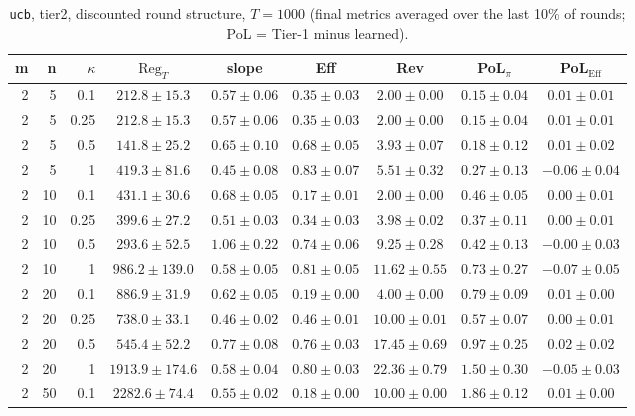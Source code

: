 \begin{table}[htbp]
\centering
\scriptsize
\caption{\texttt{ucb}, tier2, discounted round structure, $T=1000$ (final metrics averaged over the last 10\% of rounds; PoL = Tier-1 minus learned).}
\label{tab:tier2_ucb_discounted}
\begin{tabular}{@{}rrrcccccc@{}}
\toprule
m & n & $\kappa$ & $\mathrm{Reg}_T$ & slope & Eff & Rev & PoL$_\pi$ & PoL$_\mathrm{Eff}$ \\
\midrule
2 & 5 & 0.1 & $212.8 \pm 15.3$ & $0.57 \pm 0.06$ & $0.35 \pm 0.03$ & $2.00 \pm 0.00$ & $0.15 \pm 0.04$ & $0.01 \pm 0.01$ \\
2 & 5 & 0.25 & $212.8 \pm 15.3$ & $0.57 \pm 0.06$ & $0.35 \pm 0.03$ & $2.00 \pm 0.00$ & $0.15 \pm 0.04$ & $0.01 \pm 0.01$ \\
2 & 5 & 0.5 & $141.8 \pm 25.2$ & $0.65 \pm 0.10$ & $0.68 \pm 0.05$ & $3.93 \pm 0.07$ & $0.18 \pm 0.12$ & $0.01 \pm 0.02$ \\
2 & 5 & 1 & $419.3 \pm 81.6$ & $0.45 \pm 0.08$ & $0.83 \pm 0.07$ & $5.51 \pm 0.32$ & $0.27 \pm 0.13$ & $-0.06 \pm 0.04$ \\
2 & 10 & 0.1 & $431.1 \pm 30.6$ & $0.68 \pm 0.05$ & $0.17 \pm 0.01$ & $2.00 \pm 0.00$ & $0.46 \pm 0.05$ & $0.00 \pm 0.01$ \\
2 & 10 & 0.25 & $399.6 \pm 27.2$ & $0.51 \pm 0.03$ & $0.34 \pm 0.03$ & $3.98 \pm 0.02$ & $0.37 \pm 0.11$ & $0.00 \pm 0.01$ \\
2 & 10 & 0.5 & $293.6 \pm 52.5$ & $1.06 \pm 0.22$ & $0.74 \pm 0.06$ & $9.25 \pm 0.28$ & $0.42 \pm 0.13$ & $-0.00 \pm 0.03$ \\
2 & 10 & 1 & $986.2 \pm 139.0$ & $0.58 \pm 0.05$ & $0.81 \pm 0.05$ & $11.62 \pm 0.55$ & $0.73 \pm 0.27$ & $-0.07 \pm 0.05$ \\
2 & 20 & 0.1 & $886.9 \pm 31.9$ & $0.62 \pm 0.05$ & $0.19 \pm 0.00$ & $4.00 \pm 0.00$ & $0.79 \pm 0.09$ & $0.01 \pm 0.00$ \\
2 & 20 & 0.25 & $738.0 \pm 33.1$ & $0.46 \pm 0.02$ & $0.46 \pm 0.01$ & $10.00 \pm 0.01$ & $0.57 \pm 0.07$ & $0.00 \pm 0.01$ \\
2 & 20 & 0.5 & $545.4 \pm 52.2$ & $0.77 \pm 0.08$ & $0.76 \pm 0.03$ & $17.45 \pm 0.69$ & $0.97 \pm 0.25$ & $0.02 \pm 0.02$ \\
2 & 20 & 1 & $1913.9 \pm 174.6$ & $0.58 \pm 0.04$ & $0.80 \pm 0.03$ & $22.36 \pm 0.79$ & $1.50 \pm 0.30$ & $-0.05 \pm 0.03$ \\
2 & 50 & 0.1 & $2282.6 \pm 74.4$ & $0.55 \pm 0.02$ & $0.18 \pm 0.00$ & $10.00 \pm 0.00$ & $1.86 \pm 0.12$ & $0.01 \pm 0.00$ \\

\end{tabular}
\end{table}
